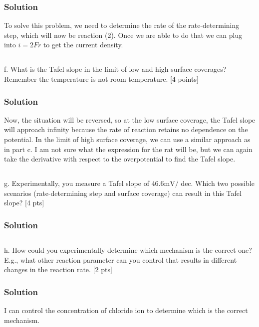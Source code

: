 \documentclass[12pt]{article}
\begin{document}
\subsubsection{Solution}
To solve this problem, we need to determine the rate of the rate-determining step, which will now be reaction (2). Once we are able to do that we can plug into $i=2 F r$ to get the current density.
\subsection{}
f. What is the Tafel slope in the limit of low and high surface coverages? Remember the temperature is not room temperature. [4 points]\\
\subsubsection{Solution}
Now, the situation will be reversed, so at the low surface coverage, the Tafel slope will approach infinity because the rate of reaction retains no dependence on the potential. In the limit of high surface coverage, we can use a similar approach as in part c.  I am not sure what the expression for the rat will be, but we can again take the derivative with respect to the overpotential to find the Tafel slope.
\subsection{}
g. Experimentally, you measure a Tafel slope of $46.6 \mathrm{mV} /$ dec. Which two possible scenarios (rate-determining step and surface coverage) can result in this Tafel slope? [4 pts]\\[0pt]
\subsubsection{Solution}
\subsection{}
h. How could you experimentally determine which mechanism is the correct one? E.g., what other reaction parameter can you control that results in different changes in the reaction rate. [2 pts]
\subsubsection{Solution}
I can control the concentration of chloride ion to determine which is the correct mechanism.
\end{document}
